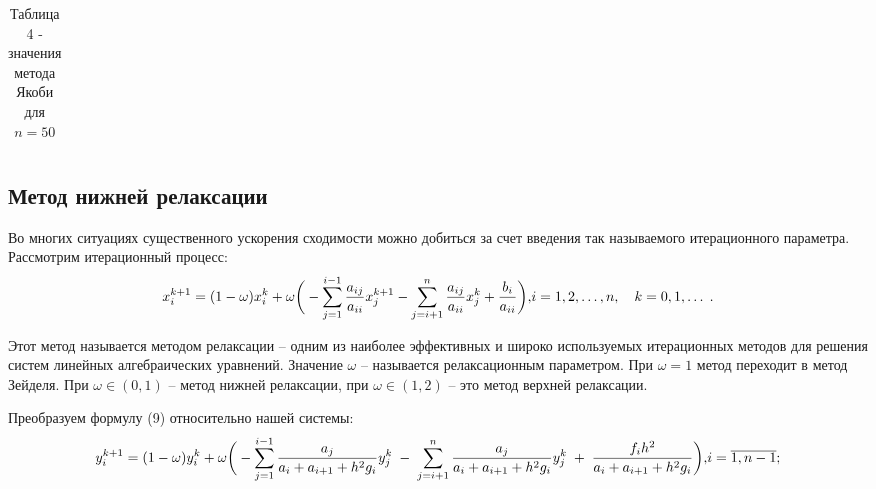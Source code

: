 \documentclass[a4paper,12pt]{article}
\begin{document}
{\begin{table}[h]
\begin{tabular}{|c|c|c|c|c|}
    \end{tabular}
    \caption*{\small{Таблица 4 - значения метода Якоби для $n = 50$}}
\end{table}
\clearpage
\subsection{Метод нижней релаксации}
\hspace{1.25cm}Во многих ситуациях существенного ускорения сходимости можно добиться за счет введения так называемого итерационного параметра. 
Рассмотрим итерационный процесс:
\begin{equation}
    x_i^{k+1}=(1-\omega)x_i^k+\omega \bigg( - \sum\limits_{j=1}^{i-1} \frac{a_{ij}}{a_{ii}}x_j^{k+1}- \sum\limits_{j=i+1}^{n} \frac{a_{ij}}{a_{ii}}x_j^{k}+\frac{b_i}{a_{ii}}\bigg),
    $$$$ i=1,2, \dots, n, \quad k=0,1, \dots \; .
    \label{9}
\end{equation}

Этот метод называется методом релаксации -- одним из наиболее эффективных и широко используемых итерационных 
методов для решения систем линейных алгебраичес\-ких уравнений. Значение $\omega $ -- называется релаксационным параметром. 
При $\omega = 1$ метод переходит в метод Зейделя.  При $\omega \in (0,1)$ -- метод нижней релаксации, при $\omega \in (1,2)$ -- это метод верхней релаксации. 

Преобразуем формулу (9) относительно нашей системы:
\begin{equation}
    y_i^{k+1}=(1-\omega)y_i^k+\omega  \bigg(-\sum\limits_{j=1}^{i-1}\frac{a_j}{a_i+a_{i+1}+h^2 g_i}y_j^{k} \; - \;\sum\limits_{j=i+1}^{n}\frac{a_{j}}{a_i+a_{i+1}+h^2 g_i}y_j^k\; +\; \frac{f_i h^2}{a_i+a_{i+1}+h^2 g_i}\bigg),$$$$
    i=\overline{1, n-1};
    \label{10}
\end{equation}

}
\end{document}
